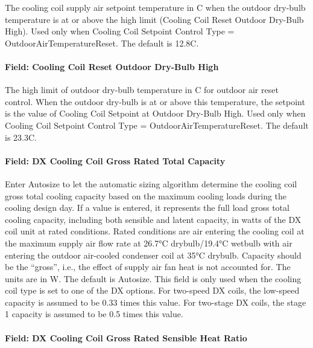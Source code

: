 The cooling coil supply air setpoint temperature in C when the outdoor dry-bulb temperature is at or above the high limit (Cooling Coil Reset Outdoor Dry-Bulb High). Used only when Cooling Coil Setpoint Control Type = OutdoorAirTemperatureReset. The default is 12.8C.

\paragraph{Field: Cooling Coil Reset Outdoor Dry-Bulb High}\label{field-cooling-coil-reset-outdoor-dry-bulb-high-2}

The high limit of outdoor dry-bulb temperature in C for outdoor air reset control. When the outdoor dry-bulb is at or above this temperature, the setpoint is the value of Cooling Coil Setpoint at Outdoor Dry-Bulb High. Used only when Cooling Coil Setpoint Control Type = OutdoorAirTemperatureReset. The default is 23.3C.

\paragraph{Field: DX Cooling Coil Gross Rated Total Capacity}\label{field-dx-cooling-coil-gross-rated-total-capacity-1}

Enter Autosize to let the automatic sizing algorithm determine the cooling coil gross total cooling capacity based on the maximum cooling loads during the cooling design day. If a value is entered, it represents the full load gross total cooling capacity, including both sensible and latent capacity, in watts of the DX coil unit at rated conditions. Rated conditions are air entering the cooling coil at the maximum supply air flow rate at 26.7°C drybulb/19.4°C wetbulb with air entering the outdoor air-cooled condenser coil at 35°C drybulb. Capacity should be the ``gross'', i.e., the effect of supply air fan heat is not accounted for. The units are in W. The default is Autosize. This field is only used when the cooling coil type is set to one of the DX options. For two-speed DX coils, the low-speed capacity is assumed to be 0.33 times this value. For two-stage DX coils, the stage 1 capacity is assumed to be 0.5 times this value.

\paragraph{Field: DX Cooling Coil Gross Rated Sensible Heat Ratio}\label{field-dx-cooling-coil-gross-rated-sensible-heat-ratio-1}

